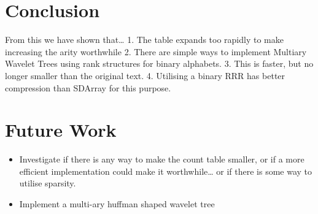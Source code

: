 \section{Conclusion}

From this we have shown that\ldots{} 1. The table expands too
rapidly to make increasing the arity worthwhile 2. There are simple
ways to implement Multiary Wavelet Trees using rank structures for
binary alphabets. 3. This is faster, but no longer smaller than the
original text. 4. Utilising a binary RRR has better compression
than SDArray for this purpose.

\section{Future Work}

\begin{itemize}
\item
  Investigate if there is any way to make the count table smaller, or
  if a more efficient implementation could make it worthwhile\ldots{}
  or if there is some way to utilise sparsity.
\item
  Implement a multi-ary huffman shaped wavelet tree
\end{itemize}